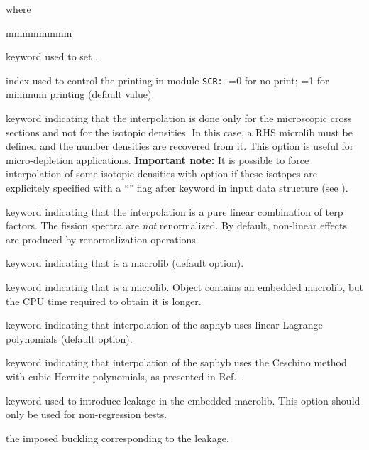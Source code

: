 \noindent where
\begin{ListeDeDescription}{mmmmmmmm}

\item[\moc{EDIT}] keyword used to set .

\item[\dusa{iprint}] index used to control the printing in module {\tt SCR:}. =0 for no print; =1 for minimum printing (default value).
 
\item[\moc{RES}] keyword indicating that the interpolation is done only for the microscopic cross sections and not for the isotopic densities. In this case, a RHS {\sc microlib} must be defined and the number densities are recovered from it. This option is useful for micro-depletion applications. {\bf Important note:} It is possible to force interpolation of some isotopic densities with  option if these
isotopes are explicitely specified with a ``\moc{*}'' flag after  keyword in  input data structure (see ).

\item[\moc{PURE}] keyword indicating that the interpolation is a pure linear combination of terp factors. The fission spectra are {\sl not}
renormalized. By default, non-linear effects are produced by renormalization operations.

\item[\moc{MACRO}] keyword indicating that  is a {\sc macrolib} (default option).

\item[\moc{MICRO}] keyword indicating that  is a {\sc microlib}. Object  contains an embedded {\sc macrolib}, but the CPU time required to obtain it is longer.

\item[\moc{LINEAR}] keyword indicating that interpolation of the {\sc saphyb} uses linear Lagrange polynomials (default option).

\item[\moc{CUBIC}] keyword indicating that interpolation of the {\sc saphyb} uses the Ceschino method
with cubic Hermite polynomials, as presented in Ref.~.

\item[\moc{LEAK}] keyword used to introduce leakage in the embedded {\sc macrolib}. This option should only be used for non-regression tests.

\item[\dusa{b2}] the imposed buckling corresponding to the leakage.


\end{ListeDeDescription}
